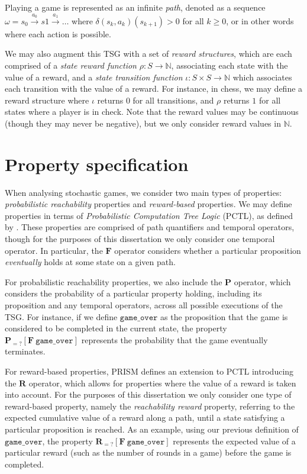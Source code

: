 Playing a game is represented as an infinite \emph{path}, denoted as a sequence $\omega = s_0 \xrightarrow{a_0} s1 \xrightarrow{a_1} \dots$ where $\delta(s_k, a_k)(s_{k+1})>0$ for all $k\geq0$, or in other words where each action is possible.

We may also augment this TSG with a set of \emph{reward structures}, which are each comprised of a \emph{state reward function} $\rho : S \rightarrow \mathbb{N}$, associating each state with the value of a reward, and a \emph{state transition function} $\iota : S \times S \rightarrow \mathbb{N}$ which associates each transition with the value of a reward. For instance, in chess, we may define a reward structure where $\iota$ returns $0$ for all transitions, and $\rho$ returns $1$ for all states where a player is in check. Note that the reward values may be continuous (though they may never be negative), but we only consider reward values in $\mathbb{N}$.

\section{Property specification}

When analysing stochastic games, we consider two main types of properties: \emph{probabilistic reachability} properties and \emph{reward-based} properties. We may define properties in terms of \emph{Probabilistic Computation Tree Logic} (PCTL), as defined by \cite{hansson_logic_1994}. These properties are comprised of path quantifiers and temporal operators, though for the purposes of this dissertation we only consider one temporal operator. In particular, the $\mathbf{F}$ operator considers whether a particular proposition \emph{eventually} holds at some state on a given path.

For probabilistic reachability properties, we also include the $\mathbf{P}$ operator, which considers the probability of a particular property holding, including its proposition and any temporal operators, across all possible executions of the TSG. For instance, if we define $\mathtt{game\_over}$ as the proposition that the game is considered to be completed in the current state, the property $\mathbf{P}_{=?} [\mathbf{F}\ \mathtt{game\_over}]$ represents the probability that the game eventually terminates.

For reward-based properties, PRISM defines an extension to PCTL introducing the $\mathbf{R}$ operator, which allows for properties where the value of a reward is taken into account. For the purposes of this dissertation we only consider one type of reward-based property, namely the \emph{reachability reward} property, referring to the expected cumulative value of a reward along a path, until a state satisfying a particular proposition is reached. As an example, using our previous definition of $\mathtt{game\_over}$, the property $\mathbf{R}_{=?} [\mathbf{F}\ \mathtt{game\_over}]$ represents the expected value of a particular reward (such as the number of rounds in a game) before the game is completed.